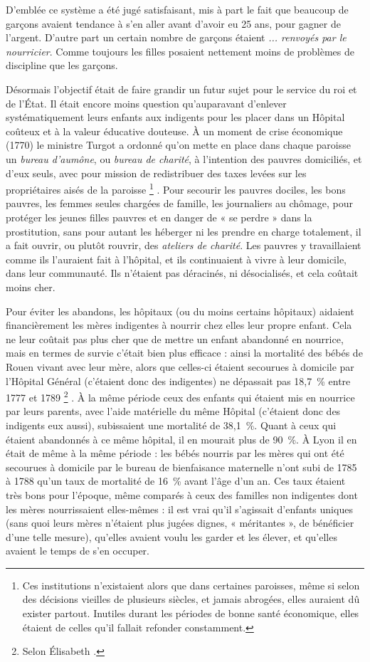  D'emblée ce système a été jugé satisfaisant, mis à part le fait que beaucoup de garçons avaient tendance à s'en aller avant d'avoir eu 25 ans, pour gagner de l'argent. D'autre part un certain nombre de garçons étaient \emph{... renvoyés par le nourricier}. Comme toujours les filles posaient nettement moins de problèmes de discipline que les garçons. 

 Désormais l'objectif était de faire grandir un futur sujet pour le service du roi et de l'État. Il était encore moins question qu'auparavant d'enlever systématiquement leurs enfants aux indigents pour les placer dans un Hôpital coûteux et à la valeur éducative douteuse. À un moment de crise économique (1770) le ministre Turgot a ordonné qu'on mette en place dans chaque paroisse un \emph{bureau d'aumône}, ou \emph{bureau de charité}, à l'intention des pauvres domiciliés, et d'eux seuls, avec pour mission de redistribuer des taxes levées sur les propriétaires aisés de la paroisse%
\footnote{Ces institutions n'existaient alors que dans certaines paroisses, même si selon des décisions vieilles de plusieurs siècles, et jamais abrogées, elles auraient dû exister partout. Inutiles durant les périodes de bonne santé économique, elles étaient de celles qu'il fallait refonder constamment.}%
. Pour secourir les pauvres dociles, les bons pauvres, les femmes seules chargées de famille, les journaliers au chômage, pour protéger les jeunes filles pauvres et en danger de « se perdre » dans la prostitution, sans pour autant les héberger ni les prendre en charge totalement, il a fait ouvrir, ou plutôt rouvrir, des \emph{ateliers de charité}. Les pauvres y travaillaient comme ils l'auraient fait à l'hôpital, et ils continuaient à vivre à leur domicile, dans leur communauté. Ils n'étaient pas déracinés, ni désocialisés, et cela coûtait moins cher. 

 Pour éviter les abandons, les hôpitaux (ou du moins certains hôpitaux) aidaient financièrement les mères indigentes à nourrir chez elles leur propre enfant. Cela ne leur coûtait pas plus cher que de mettre un enfant abandonné en nourrice, mais en termes de survie c'était bien plus efficace : ainsi la mortalité des bébés de Rouen vivant avec leur mère, alors que celles-ci étaient secourues à domicile par l'Hôpital Général (c'étaient donc des indigentes) ne dépassait pas 18,7~\% entre 1777 et 1789%
\footnote{Selon Élisabeth .}%
. À la même période ceux des enfants qui étaient mis en nourrice par leurs parents, avec l'aide matérielle du même Hôpital (c'étaient donc des indigents eux aussi), subissaient une mortalité de 38,1~\%. Quant à ceux qui étaient abandonnés à ce même hôpital, il en mourait plus de 90~\%. À Lyon il en était de même à la même période : les bébés nourris par les mères qui ont été secourues à domicile par le bureau de bienfaisance maternelle n'ont subi de 1785 à 1788 qu'un taux de mortalité de 16~\% avant l'âge d'un an. Ces taux étaient très bons pour l'époque, même comparés à ceux des familles non indigentes dont les mères nourrissaient elles-mêmes : il est vrai qu'il s'agissait d'enfants uniques (sans quoi leurs mères n'étaient plus jugées dignes, « méritantes », de bénéficier d'une telle mesure), qu'elles avaient voulu les garder et les élever, et qu'elles avaient le temps de s'en occuper.

